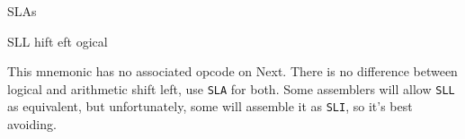 \begin{basedescript}{
	\desclabelstyle{\multilinelabel}
	\desclabelwidth{3cm}}
\begin{DetailItem}{SLA}{s}
		\begin{DetailEffects}[p]
			\FlagsSLAr
		\end{DetailEffects}

		\begin{DetailEffectsFlags}
			\DetailFlagSF{\DetailFlagResultSign}
			\DetailFlagZF{\DetailFlagResultZero}
			\DetailFlagPV{\DetailFlagResultParity}
		\end{DetailEffectsFlags}

		\begin{DetailTiming}
		\end{DetailTiming}

	\end{DetailItem}


	\begin{DetailItem}{SLL}{}
		{hift \IH{L}eft ogical}
		{}

		This mnemonic has no associated opcode on Next. There is no difference between logical and arithmetic shift left, use {\tt SLA} for both. Some assemblers will allow {\tt SLL} as equivalent, but unfortunately, some will assemble it as {\tt SLI}, so it's best avoiding.
		
	\end{DetailItem}

	\pagebreak



\end{basedescript}
